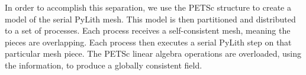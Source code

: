 In order to accomplish this separation, we use the PETSc
 structure to create a model of the serial
PyLith mesh. This model is then partitioned and distributed to a set
of processes. Each process receives a self-consistent mesh, meaning
the pieces are overlapping. Each process then executes a serial PyLith
step on that particular mesh piece. The PETSc linear algebra
operations are overloaded, using the 
information, to produce a globally consistent field.

